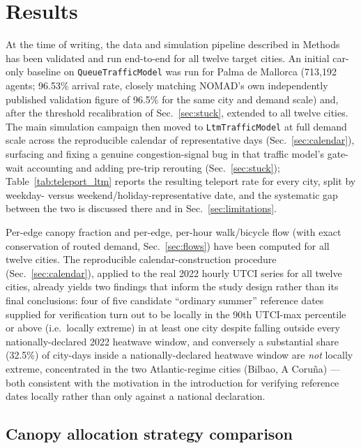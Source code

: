 \documentclass[pdflatex,sn-mathphys-ay]{sn-jnl}
\begin{document}
\section{Results}
\label{sec:results}

At the time of writing, the data and simulation pipeline described in
Methods has been validated and run end-to-end for all twelve target cities.
An initial car-only baseline on \texttt{QueueTrafficModel} was run for Palma
de Mallorca (713{,}192 agents; 96.53\% arrival rate, closely matching
NOMAD's own independently published validation figure of 96.5\% for the same
city and demand scale) and, after the threshold recalibration of
Sec.~\ref{sec:stuck}, extended to all twelve cities. The main simulation
campaign then moved to \texttt{LtmTrafficModel} at full demand scale across
the reproducible calendar of representative days (Sec.~\ref{sec:calendar}),
surfacing and fixing a genuine congestion-signal bug in that traffic model's
gate-wait accounting and adding pre-trip rerouting (Sec.~\ref{sec:stuck});
Table~\ref{tab:teleport_ltm} reports the resulting teleport rate for every
city, split by weekday- versus weekend/holiday-representative date, and the
systematic gap between the two is discussed there and in
Sec.~\ref{sec:limitations}.

Per-edge canopy fraction and per-edge, per-hour walk/bicycle flow (with
exact conservation of routed demand, Sec.~\ref{sec:flows}) have been
computed for all twelve cities. The reproducible calendar-construction
procedure (Sec.~\ref{sec:calendar}), applied to the real 2022 hourly UTCI
series for all twelve cities, already yields two findings that inform the
study design rather than its final conclusions: four of five candidate
``ordinary summer'' reference dates supplied for verification turn out to be
locally in the 90th UTCI-max percentile or above (i.e.\ locally extreme) in
at least one city despite falling outside every nationally-declared 2022
heatwave window, and conversely a substantial share (32.5\%) of city-days
inside a nationally-declared heatwave window are \emph{not} locally extreme,
concentrated in the two Atlantic-regime cities (Bilbao, A Coru\~na) --- both
consistent with the motivation in the introduction for verifying reference
dates locally rather than only against a national declaration.

\subsection{Canopy allocation strategy comparison}
\label{sec:results_interventions}
\end{document}
